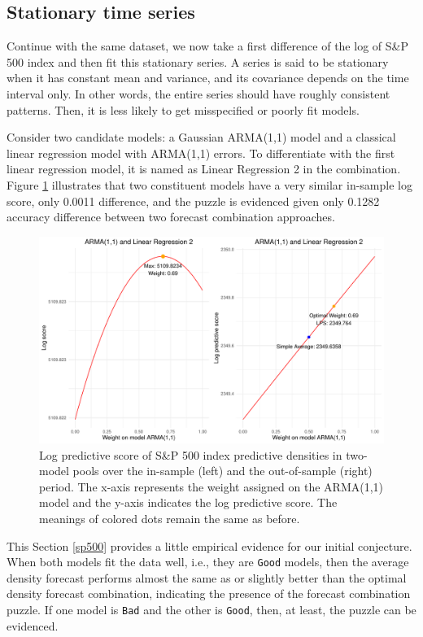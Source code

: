 \documentclass{monashthesis}
\begin{document}
\hypertarget{stationary-time-series}{%
\subsection{Stationary time series}\label{stationary-time-series}}

Continue with the same dataset, we now take a first difference of the log of S\&P 500 index and then fit this stationary series. A series is said to be stationary when it has constant mean and variance, and its covariance depends on the time interval only. In other words, the entire series should have roughly consistent patterns. Then, it is less likely to get misspecified or poorly fit models.

Consider two candidate models: a Gaussian ARMA(1,1) model and a classical linear regression model with ARMA(1,1) errors. To differentiate with the first linear regression model, it is named as Linear Regression 2 in the combination. Figure \ref{fig:stat} illustrates that two constituent models have a very similar in-sample log score, only 0.0011 difference, and the puzzle is evidenced given only 0.1282 accuracy difference between two forecast combination approaches.

\begin{figure}[ht]
\centering
\includegraphics[scale=0.6]{figures/SP500_stationary.pdf}
\caption{Log predictive score of S\&P 500 index predictive densities in two-model pools over the in-sample (left) and the out-of-sample (right) period. The x-axis represents the weight assigned on the ARMA(1,1) model and the y-axis indicates the log predictive score. The meanings of colored dots remain the same as before.}
\label{fig:stat}
\end{figure}

This Section \ref{sp500} provides a little empirical evidence for our initial conjecture. When both models fit the data well, i.e., they are \texttt{Good} models, then the average density forecast performs almost the same as or slightly better than the optimal density forecast combination, indicating the presence of the forecast combination puzzle. If one model is \texttt{Bad} and the other is \texttt{Good}, then, at least, the puzzle can be evidenced.
\end{document}
